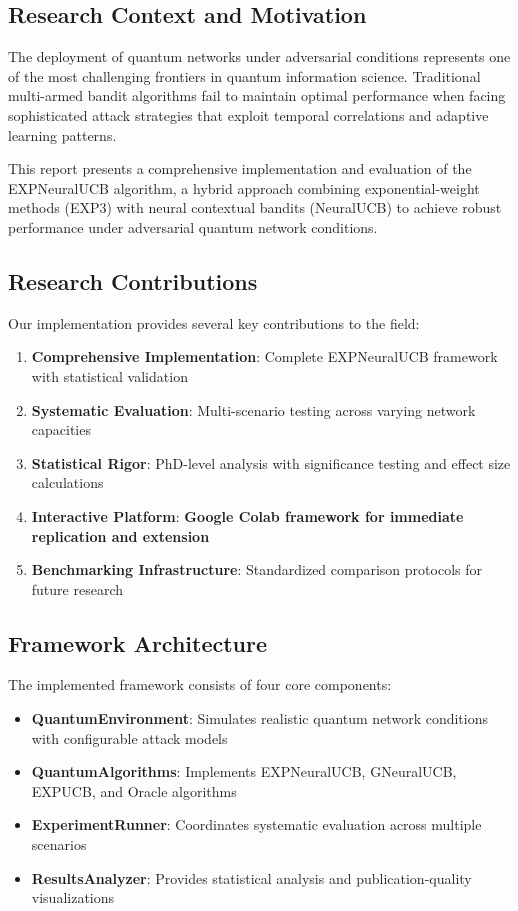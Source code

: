 \documentclass[11pt,a4paper]{article}
\newcommand{\colab}[1]{\textcolor{colabcolor}{\textbf{#1}}}
\begin{document}
\subsection{Research Context and Motivation}

The deployment of quantum networks under adversarial conditions represents one of the most challenging frontiers in quantum information science. Traditional multi-armed bandit algorithms fail to maintain optimal performance when facing sophisticated attack strategies that exploit temporal correlations and adaptive learning patterns.

This report presents a comprehensive implementation and evaluation of the EXPNeuralUCB algorithm, a hybrid approach combining exponential-weight methods (EXP3) with neural contextual bandits (NeuralUCB) to achieve robust performance under adversarial quantum network conditions.

\subsection{Research Contributions}

Our implementation provides several key contributions to the field:

\begin{enumerate}
\item \textbf{Comprehensive Implementation}: Complete EXPNeuralUCB framework with statistical validation
\item \textbf{Systematic Evaluation}: Multi-scenario testing across varying network capacities
\item \textbf{Statistical Rigor}: PhD-level analysis with significance testing and effect size calculations
\item \textbf{Interactive Platform}: \colab{Google Colab framework for immediate replication and extension}
\item \textbf{Benchmarking Infrastructure}: Standardized comparison protocols for future research
\end{enumerate}

\subsection{Framework Architecture}

The implemented framework consists of four core components:

\begin{itemize}
\item \textbf{QuantumEnvironment}: Simulates realistic quantum network conditions with configurable attack models
\item \textbf{QuantumAlgorithms}: Implements EXPNeuralUCB, GNeuralUCB, EXPUCB, and Oracle algorithms
\item \textbf{ExperimentRunner}: Coordinates systematic evaluation across multiple scenarios
\item \textbf{ResultsAnalyzer}: Provides statistical analysis and publication-quality visualizations
\end{itemize}
\end{document}
